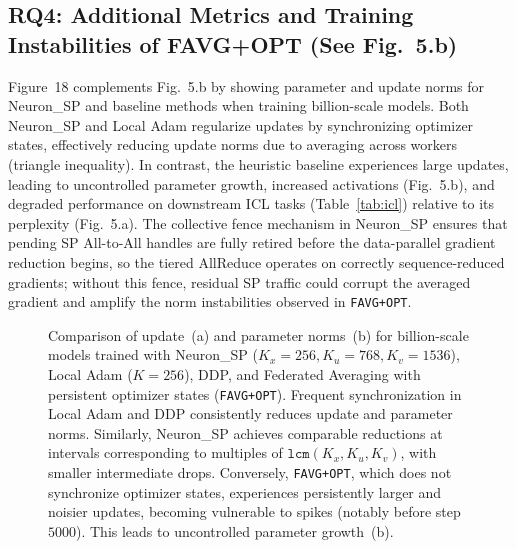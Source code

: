 \documentclass{article}
\begin{document}
\subsection{RQ4: Additional Metrics and Training Instabilities of FAVG+OPT (See Fig.~5.b)}
\label{sec:b4_favgopt}

Figure~18 complements Fig.~5.b by showing parameter and update norms for Neuron\_SP and baseline methods when training billion-scale models. Both Neuron\_SP and Local Adam regularize updates by synchronizing optimizer states, effectively reducing update norms due to averaging across workers (triangle inequality). In contrast, the heuristic baseline \citep{Sani2025} experiences large updates, leading to uncontrolled parameter growth, increased activations (Fig.~5.b), and degraded performance on downstream ICL tasks (Table~\ref{tab:icl}) relative to its perplexity (Fig.~5.a). The collective fence mechanism in Neuron\_SP ensures that pending SP All-to-All handles are fully retired before the data-parallel gradient reduction begins, so the tiered AllReduce operates on correctly sequence-reduced gradients; without this fence, residual SP traffic could corrupt the averaged gradient and amplify the norm instabilities observed in \texttt{FAVG+OPT}.

\begin{figure}[ht]
\centering
\caption{Comparison of update~(a) and parameter norms~(b) for billion-scale models trained with Neuron\_SP ($K_x=256, K_u=768, K_v=1536$), Local Adam ($K=256$), DDP, and Federated Averaging with persistent optimizer states (\texttt{FAVG+OPT}). Frequent synchronization in Local Adam and DDP consistently reduces update and parameter norms. Similarly, Neuron\_SP achieves comparable reductions at intervals corresponding to multiples of $\texttt{lcm}(K_x, K_u, K_v)$, with smaller intermediate drops. Conversely, \texttt{FAVG+OPT}, which does not synchronize optimizer states, experiences persistently larger and noisier updates, becoming vulnerable to spikes (notably before step $5000$). This leads to uncontrolled parameter growth~(b).}
\label{fig:18}
\end{figure}
\end{document}
